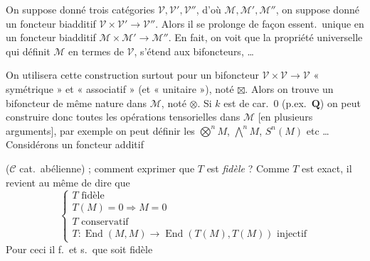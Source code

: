 \documentclass[11pt,a4paper]{article}
\begin{document}
On suppose donné trois catégories 
$\mathcal{V}, \mathcal{V}', \mathcal{V}''$, d'où $\mathcal{M}, \mathcal{M}',
\mathcal{M}''$, on suppose donné un foncteur biadditif
$\mathcal{V} \times \mathcal{V}' \to \mathcal{V}''$. Alors il se prolonge de
façon essent.\ unique en un foncteur biadditif
$\mathcal{M} \times \mathcal{M}' \to \mathcal{M}''$. En fait, on voit que la
propriété  universelle qui définit $\mathcal{M}$ en
termes de $\mathcal{V}$, s'étend aux bifoncteurs, …

On utilisera cette construction surtout pour un bifoncteur
$\mathcal{V} \times \mathcal{V} \to \mathcal{V}$ « symétrique » et
« associatif » (et « unitaire »), noté \struck{$\otimes$} $\boxtimes$. Alors on
trouve un bifoncteur de même nature dans $\mathcal{M}$, noté $\otimes$. Si $k$
est de car.\ 0 (p.ex.\ $\mathbf{Q}$) on peut construire donc toutes les
opérations tensorielles  dans $\mathcal{M}$ [en
plusieurs arguments], par exemple on peut définir les
$\bigotimes^{n} M$, $\bigwedge^{n} M$,  $S^{n}(M)$ etc …
Considérons un foncteur additif


($\mathcal{C}$ cat.\ abélienne) ; comment exprimer que $T$ est \emph{fidèle} ?
Comme $T$ est exact, il revient au même de dire que
\struck{\ill{}}
\[
\left\{
\begin{array}{l}
  T \text{ fidèle} \\
  T(M) = 0 \Longrightarrow M = 0 \\
  T \text{ conservatif} \\
  T \colon \operatorname{End}(M,M) \to \operatorname{End}(T(M),T(M))
  \text{ injectif}
\end{array}
\right.
\]
Pour ceci il f.\ et s.\ que  soit fidèle
\end{document}
